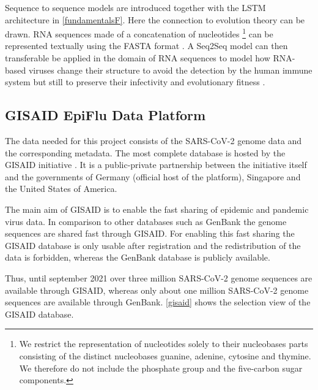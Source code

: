 Sequence to sequence models are introduced together with the \ac{LSTM} architecture in \autoref{fundamentalsF}. Here the connection to evolution theory can be drawn. \ac{RNA} sequences made of a concatenation of nucleotides \footnote{We restrict the representation of nucleotides solely to their nucleobases parts consisting of the distinct nucleobases guanine, adenine, cytosine and thymine. We therefore do not include the phosphate group and the five-carbon sugar components.} can be represented textually using the FASTA format \cite{cockBiopythonFreelyAvailable2009}. A \ac{Seq2Seq} model can then transferable be applied in the domain of \ac{RNA} sequences to model how \ac{RNA}-based viruses change their structure to avoid the detection by the human immune system but still to preserve their in\-fec\-tivi\-ty and evolutionary fitness \cite{Hie2021}. 

\subsection{GISAID EpiFlu Data Platform} \label{fundamentalsC}

The data needed for this project consists of the \ac{SARS-CoV-2} genome data and the corresponding metadata. The most complete database is hosted by the \ac{GISAID} initiative \cite{Gisaid2021}. It is a public-private partnership between the initiative itself and the governments of Germany (official host of the platform), Singapore and the United States of America. \cite{gisaideditorGISAID2021}

The main aim of \ac{GISAID} is to enable the fast sharing of epidemic and pandemic virus data. In comparison to other databases such as GenBank the genome sequences are shared fast through \ac{GISAID}. For enabling this fast sharing the \ac{GISAID} database is only usable after registration and the redistribution of the data is forbidden, whereas the GenBank database is publicly available. \cite{shuGISAIDGlobalInitiative2017}

Thus, until september 2021 over three million \ac{SARS-CoV-2} genome se\-quen\-ces are available through \ac{GISAID}, whereas only about one million \ac{SARS-CoV-2} genome se\-quen\-ces are available through GenBank. \autoref{gisaid} shows the selection view of the \ac{GISAID} database. \cite{gisaideditorGISAID2021, nationallibraryofmedicinencbieditorNCBISARSCoV2Resources}

